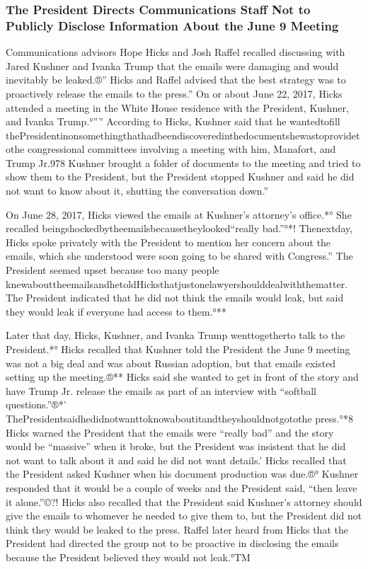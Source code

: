 \subsubsection{The President Directs Communications Staff Not to Publicly Disclose Information About the June 9 Meeting}

Communications advisors Hope Hicks and Josh Raffel recalled discussing with Jared Kushner and Ivanka Trump that the emails were damaging and would inevitably be leaked.®”
Hicks and Raffel advised that the best strategy was to proactively release the emails to the press.”
On or about June 22, 2017, Hicks attended a meeting in the White House residence with the President, Kushner, and Ivanka Trump.°””
According to Hicks, Kushner said that he wantedtofill thePresidentinonsomethingthathadbeendiscoveredinthedocumentshewastoprovidetothe congressional committees involving a meeting with him, Manafort, and Trump Jr.978
Kushner brought a folder of documents to the meeting and tried to show them to the President, but the President stopped Kushner and said he did not want to know about it, shutting the conversation down.”

On June 28, 2017, Hicks viewed the emails at Kushner's attorney's office.*°
She recalled beingshockedbytheemailsbecausetheylooked“really bad.”°*!
Thenextday, Hicks spoke privately with the President to mention her concern about the emails, which she understood were soon going to be shared with Congress.”
The President seemed upset because too many people knewabouttheemailsandhetoldHicksthatjustonelawyershoulddealwiththematter.
The President indicated that he did not think the emails would leak, but said they would leak if everyone had access to them.°**

Later that day, Hicks, Kushner, and Ivanka Trump wenttogetherto talk to the President.*°
Hicks recalled that Kushner told the President the June 9 meeting was not a big deal and was about Russian adoption, but that emails existed setting up the meeting.®**
Hicks said she wanted to get in front of the story and have Trump Jr. release the emails as part of an interview with “softball questions.”®*'
ThePresidentsaidhedidnotwanttoknowaboutitandtheyshouldnotgotothe press.°*8
Hicks warned the President that the emails were “really bad” and the story would be “massive” when it broke, but the President was insistent that he did not want to talk about it and said he did not want details.'
Hicks recalled that the President asked Kushner when his document production was due.®°
Kushner responded that it would be a couple of weeks and the President said, “then leave it alone.”©?!
Hicks also recalled that the President said Kushner's attorney should give the emails to whomever he needed to give them to, but the President did not think they would be leaked to the press.
Raffel later heard from Hicks that the President had directed the group not to be proactive in disclosing the emails because the President believed they would not leak.°TM

